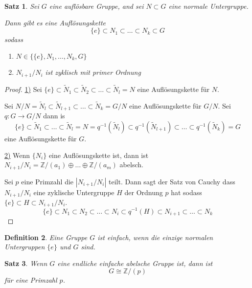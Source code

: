 \documentclass[a4paper,12pt,numbers=noenddot,parskip=full]{scrartcl}
\newcommand{\setZ}{\mathbb{Z}}
\newcommand{\abs}[1]{{\left| #1 \right|}}
\newcommand{\heading}{\underline}
\theoremstyle{dotless}
\newtheorem{theorem}{Satz}[section]
\newtheorem{definition}[theorem]{Definition}
\theoremstyle{remark}
\begin{document}
	\begin{theorem}
		Sei $G$ eine auflösbare Gruppe, and sei $N \subset G$ eine normale Untergruppe.
		
		Dann gibt es eine Auflösungskette
		\begin{equation*}
			\{ e \} \subset N_1 \subset \dots \subset N_k \subset G
		\end{equation*}
		sodass
		\begin{enumerate}
			\item $N \in \{ \{e\}, N_1, \dots, N_k, G \}$
			\item $N_{i+1}/N_i$ ist zyklisch mit primer Ordnung
		\end{enumerate}
	\end{theorem}

	\begin{proof}
		\heading{1)} Sei $\{ e \}  \subset \tilde{N}_1 \subset \tilde{N}_2 \subset \dots \subset \tilde{N}_l = N$ eine Auflösungskette für $N$.
		
		Sei $N/N = \tilde{N}_{l} \subset \tilde{N}_{l+1} \subset \dots \subset \tilde{N}_k = G/N$ eine Auflösungskette für $G/N$. Sei $q: G \to G/N$ dann is
		\begin{equation*}
			\{ e \} \subset \tilde{N}_1 \subset \dots \subset \tilde{N}_l = N = q^{-1}(\tilde{N}_l) \subset q^{-1}(\tilde{N}_{l+1}) \subset \dots \subset q^{-1}(\tilde{N}_k) = G
		\end{equation*}
		eine Auflösungskette für $G$.
		
		\heading{2)} Wenn $\{ N_i \}$ eine Auflösungskette ist, dann ist $N_{i+1}/N_i = \setZ/(a_1) \oplus \dots \oplus \setZ/(a_m)$ abelsch.
		
		Sei $p$ eine Primzahl die $\abs{N_{i+1}/N_i}$ teilt. Dann sagt der Satz von Cauchy dass $N_{i+1} / N_i$ eine zyklische Untergruppe $H$ der Ordnung $p$ hat sodass $\{ e \} \subset H \subset N_{i+1}/N_i$.
		\begin{equation*}
			\{ e \} \subset N_1 \subset N_2 \subset \dots \subset N_i \subset q^{-1}(H) \subset N_{i+1} \subset \dots \subset N_k
		\end{equation*}
	\end{proof}

	\begin{definition}
		Eine Gruppe $G$ ist einfach, wenn die einzige normalen Untergruppen $\{ e \}$ und $G$ sind.
	\end{definition}

	\begin{theorem}
		Wenn $G$ eine endliche einfache abelsche Gruppe ist, dann ist
		\begin{equation*}
			G \cong \setZ/(p)
		\end{equation*}
		für eine Primzahl $p$.
	\end{theorem}
\end{document}
